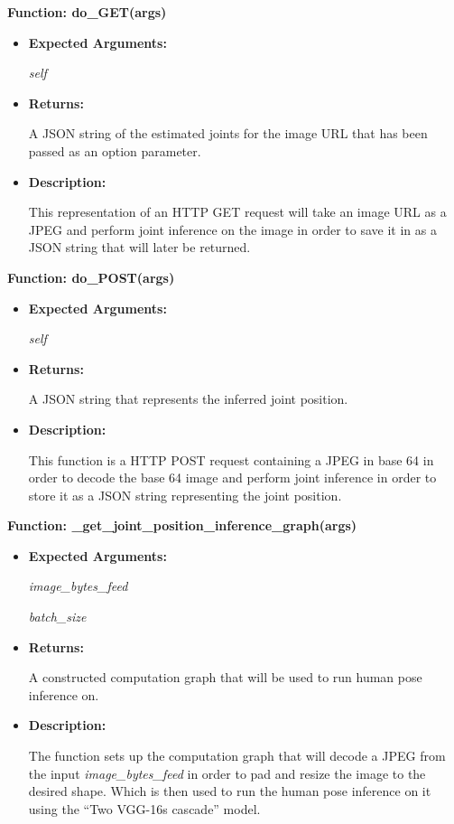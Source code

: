 \documentclass{scrreprt}
\begin{document}
\textbf{Function: do\_GET(args)}
\begin{itemize}
    \item \textbf{Expected Arguments:}

           \quad\textit{self}

    \item \textbf{Returns:}

            A JSON string of the estimated joints for the image URL that has
                been passed as an option parameter.

    \item \textbf{Description:}

            This representation of an HTTP GET request will take an image URL
                as a JPEG and perform joint inference on the image in order to
                save it in as a JSON string that will later be returned.

\end{itemize}

\textbf{Function: do\_POST(args)}
\begin{itemize}
    \item \textbf{Expected Arguments:}

            \quad\textit{self}

    \item \textbf{Returns:}

            A JSON string that represents the inferred joint position.

    \item \textbf{Description:}

            This function is a HTTP POST request containing a JPEG in base 64
                in order to decode the base 64 image and perform joint
                inference in order to store it as a JSON string representing
                the joint position.

\end{itemize}

\textbf{Function: \_get\_joint\_position\_inference\_graph(args)}
\begin{itemize}
    \item \textbf{Expected Arguments:}

            \quad\textit{image\_bytes\_feed}

            \quad\textit{batch\_size}

    \item \textbf{Returns:}

            A constructed computation graph that will be used to run human pose
                inference on.

    \item \textbf{Description:}

            The function sets up the computation graph that will decode a JPEG
                from the input \textit{image\_bytes\_feed} in order to pad and
                resize the image to the desired shape. Which is then used to
                run the human pose inference on it using the ``Two VGG-16s
                cascade'' model.
\end{itemize}
\end{document}
